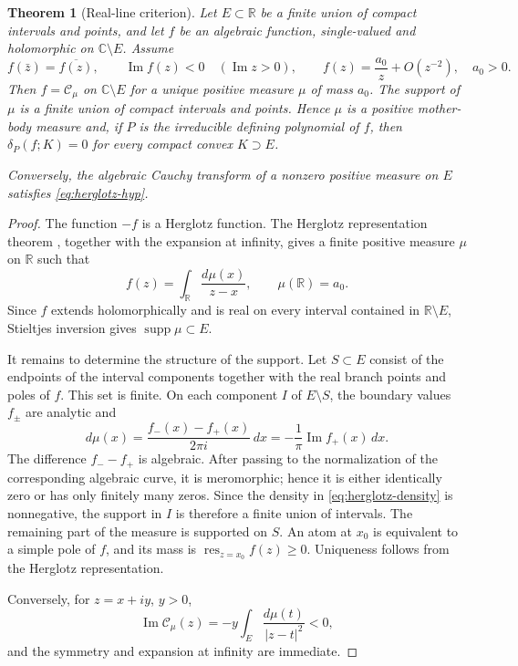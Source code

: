 \documentclass[reqno]{amsart}
\newtheorem{theorem}{Theorem}[section]
\theoremstyle{definition}
\theoremstyle{remark}
\newcommand{\bC}{\mathbb C}
\newcommand{\bR}{\mathbb R}
\newcommand{\Cauchy}{\mathcal C}
\newcommand{\supp}{\operatorname{supp}}
\renewcommand{\Im}{\operatorname{Im}}
\begin{document}
\begin{theorem}[Real-line criterion]\label{thm:herglotz}
Let $E\subset\bR$ be a finite union of compact intervals and points, and let
$f$ be an algebraic function, single-valued and holomorphic on $\bC\setminus E$.
Assume
\begin{equation}\label{eq:herglotz-hyp}
 f(\bar z)=\overline{f(z)},\qquad
 \Im f(z)<0\quad(\Im z>0),\qquad
 f(z)=\frac{a_0}{z}+O(z^{-2}),\quad a_0>0.
\end{equation}
Then $f=\Cauchy_\mu$ on $\bC\setminus E$ for a unique positive measure $\mu$
of mass $a_0$.  The support of $\mu$ is a finite union of compact intervals and
points.  Hence $\mu$ is a positive mother-body measure and, if $P$ is the irreducible
defining polynomial of $f$, then $\delta_P(f;K)=0$ for every compact convex
$K\supset E$.

Conversely, the algebraic Cauchy transform of a nonzero positive measure on
$E$ satisfies \eqref{eq:herglotz-hyp}.
\end{theorem}

\begin{proof}
The function $-f$ is a Herglotz function.  The Herglotz representation theorem
\cite[Chapter~III]{Donoghue}, together with the expansion at infinity, gives a
finite positive measure $\mu$ on $\bR$ such that
\[
 f(z)=\int_{\bR}\frac{d\mu(x)}{z-x},\qquad \mu(\bR)=a_0.
\]
Since $f$ extends holomorphically and is real on every interval contained in
$\bR\setminus E$, Stieltjes inversion gives $\supp\mu\subset E$.

It remains to determine the structure of the support.  Let $S\subset E$ consist
of the endpoints of the interval components together with the real branch
points and poles of $f$.  This set is finite.  On each component $I$ of
$E\setminus S$, the boundary values $f_\pm$ are analytic and
\begin{equation}\label{eq:herglotz-density}
 d\mu(x)=\frac{f_-(x)-f_+(x)}{2\pi i}\,dx
        =-\frac1\pi\Im f_+(x)\,dx.
\end{equation}
The difference $f_--f_+$ is algebraic.  After passing to the normalization of
the corresponding algebraic curve, it is meromorphic; hence it is either
identically zero or has only finitely many zeros.  Since the density in
\eqref{eq:herglotz-density} is nonnegative, the support in $I$ is therefore a
finite union of intervals.  The remaining part of the measure is supported on
$S$.  An atom at $x_0$ is equivalent to a simple pole of $f$, and its mass is
$\operatorname*{res}_{z=x_0}f(z)\ge0$.  Uniqueness follows from the Herglotz
representation.

Conversely, for $z=x+iy$, $y>0$,
\[
 \Im\Cauchy_\mu(z)=-y\int_E\frac{d\mu(t)}{|z-t|^2}<0,
\]
and the symmetry and expansion at infinity are immediate.
\end{proof}
\end{document}
